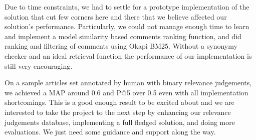 \documentclass[article]{IEEEtran}
\begin{document}
Due to time constraints, we had to settle for a prototype implementation of the solution that cut few corners here and there that we believe affected our solution's performance. Particularly, we could not manage enough time to learn and implement a model similarity based comments ranking function, and did ranking and filtering of comments using Okapi BM25. Without a synonymy checker and an ideal retrieval function the performance of our implementation is still very encouraging.

On a sample articles set annotated by human with binary relevance judgements, we achieved a MAP around 0.6 and P@5 over 0.5         even with all implementation shortcomings. This is a good enough result to be excited about and we are interested to take the project to the next step by enhancing our relevance judgements database, implementing a full fledged solution, and doing more evaluations. We just need some guidance and support along the way. 


 
\end{document}
